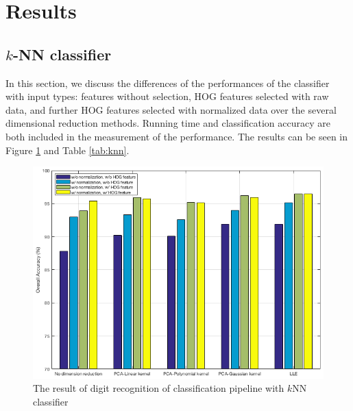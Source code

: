 \documentclass[12pt]{article}
\begin{document}
\section{Results}
\label{sec:res}

\subsection{$k$-NN classifier}
In this section, we discuss the differences of the performances of the classifier with input types: features without selection, HOG features selected with raw data, and further HOG features selected with normalized data over the several dimensional reduction methods. Running time and classification accuracy are both included in the measurement of the performance. The results can be seen in Figure \ref{fig:knn} and Table \ref{tab:knn}.

\begin{figure}[tbp]
	\centering
	\includegraphics[width =\textwidth]{knn}		
	\caption{The result of digit recognition of classification pipeline with $k$NN classifier}
	\label{fig:knn}
\end{figure}
\end{document}
